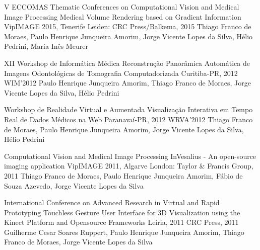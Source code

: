 \begin{cventries}
  \cventry
    {V ECCOMAS Thematic Conferences on Computational Vision and Medical Image Processing}
    {Medical Volume Rendering based on Gradient Information}
    {VipIMAGE 2015, Tenerife}
    {Leiden: CRC Press/Balkema, 2015}
    {
    Thiago Franco de Moraes,
    Paulo Henrique Junqueira Amorim,
    Jorge Vicente Lopes da Silva,
    Hélio Pedrini,
    Maria Inês Meurer
    }
   
   \cventry
    {XII Workshop de Informática Médica}
    {Reconstrução Panorâmica Automática de Imagens Odontológicas de Tomografia Computadorizada}
    {Curitiba-PR, 2012}
    {WIM'2012}
    {
    Paulo Henrique Junqueira Amorim,
    Thiago Franco de Moraes,
    Jorge Vicente Lopes da Silva,
    Hélio Pedrini
    }
    
   \cventry
    {Workshop de Realidade Virtual e Aumentada}
    {Visualização Interativa em Tempo Real de Dados Médicos na Web}
    {Paranavaí-PR, 2012}
    {WRVA'2012}
    {
    Thiago Franco de Moraes,
    Paulo Henrique Junqueira Amorim,
    Jorge Vicente Lopes da Silva,
    Hélio Pedrini
    }
    
   \cventry
    {Computational Vision and Medical Image Processing}
    {InVesalius - An open-source imaging application}
    {VipIMAGE 2011, Algarve}
    {London: Taylor \& Francis Group, 2011}
    {
    Thiago Franco de Moraes,
    Paulo Henrique Junqueira Amorim,
    Fábio de Souza Azevedo,
    Jorge Vicente Lopes da Silva
    }
    
  \cventry
    {International Conference on Advanced Research in Virtual and Rapid Prototyping}
    {Touchless Gesture User Interface for 3D Visualization using the Kinect Platform and Opensource
Frameworks}
    {Leiria, 2011}
    {CRC Press, 2011}
    {
    Guilherme Cesar Soares Ruppert,
    Paulo Henrique Junqueira Amorim,
    Thiago Franco de Moraes,
    Jorge Vicente Lopes da Silva
    }
    
    
    


\end{cventries}
